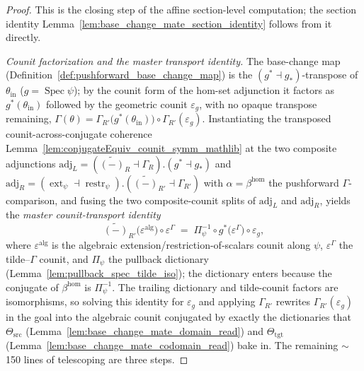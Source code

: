 \begin{proof}
  This is the closing step of the affine section-level computation; the section
  identity Lemma~\ref{lem:base_change_mate_section_identity} follows from it directly.

  \emph{Counit factorization and the master transport identity.} The base-change map
  (Definition~\ref{def:pushforward_base_change_map}) is the \((g^* \dashv g_*)\)-transpose of
  \(\theta_{\mathrm{in}}\) (\(g = \operatorname{Spec}\psi\)); by the counit form of the hom-set
  adjunction it factors as \(g^*(\theta_{\mathrm{in}})\) followed by the geometric counit
  \(\varepsilon_g\), with no opaque transpose remaining,
  \(\Gamma(\theta) = \Gamma_{R'}\bigl(g^*(\theta_{\mathrm{in}})\bigr) \circ \Gamma_{R'}(\varepsilon_g)\).
  Instantiating the transposed counit-across-conjugate coherence
  Lemma~\ref{lem:conjugateEquiv_counit_symm_mathlib} at the two composite adjunctions
  \(\mathrm{adj}_L = (\widetilde{(-)}_R \dashv \Gamma_R) . (g^* \dashv g_*)\) and
  \(\mathrm{adj}_R = (\operatorname{ext}_\psi \dashv \operatorname{restr}_\psi) .
  (\widetilde{(-)}_{R'} \dashv \Gamma_{R'})\) with \(\alpha = \beta^{\mathrm{hom}}\) the pushforward
  \(\Gamma\)-comparison, and fusing the two composite-counit splits of \(\mathrm{adj}_L\) and
  \(\mathrm{adj}_R\), yields the \emph{master counit-transport identity}
  \[
    \widetilde{(-)}_{R'}\!\bigl(\varepsilon^{\mathrm{alg}}\bigr) \circ \varepsilon^{\Gamma}
    \;=\;
    \Pi_{\psi}^{-1} \circ g^*\!\bigl(\varepsilon^{\Gamma}\bigr) \circ \varepsilon_g ,
  \]
  where \(\varepsilon^{\mathrm{alg}}\) is the algebraic extension/restriction-of-scalars counit
  along \(\psi\), \(\varepsilon^{\Gamma}\) the tilde--\(\Gamma\) counit, and \(\Pi_{\psi}\) the
  pullback dictionary (Lemma~\ref{lem:pullback_spec_tilde_iso}); the dictionary enters because the
  conjugate of \(\beta^{\mathrm{hom}}\) is \(\Pi_{\psi}^{-1}\). The trailing dictionary and
  tilde-counit factors are isomorphisms, so solving this identity for \(\varepsilon_g\) and applying
  \(\Gamma_{R'}\) rewrites \(\Gamma_{R'}(\varepsilon_g)\) in the goal into the algebraic counit
  conjugated by exactly the dictionaries that \(\Theta_{\mathrm{src}}\)
  (Lemma~\ref{lem:base_change_mate_domain_read}) and \(\Theta_{\mathrm{tgt}}\)
  (Lemma~\ref{lem:base_change_mate_codomain_read}) bake in. The remaining \(\sim\)150 lines of
  telescoping are three steps.


\end{proof}

